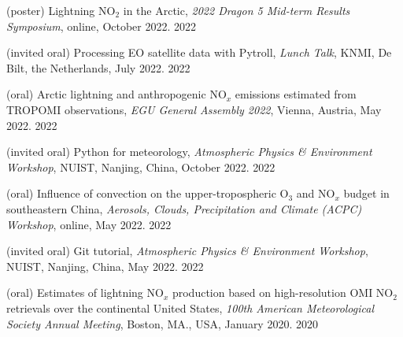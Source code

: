 \clearpage
{}


\begin{cvpublications}

\publication
{(poster) Lightning NO$_2$ in the Arctic,
\emph{2022 Dragon 5 Mid-term Results Symposium},
online, October 2022.} %
{2022} %

\publication
{(invited oral) Processing EO satellite data with Pytroll,
\emph{Lunch Talk},
KNMI, De Bilt, the Netherlands, July 2022.} %
{2022} %

\publication
{(oral) Arctic lightning and anthropogenic NO$_x$ emissions estimated from TROPOMI observations,
\emph{EGU General Assembly 2022},
Vienna, Austria, May 2022.} %
{2022} %

\publication
{(invited oral) Python for meteorology,
\emph{Atmospheric Physics \& Environment Workshop},
NUIST, Nanjing, China, October 2022.} %
{2022} %

\publication
{(oral) Influence of convection on the upper-tropospheric O$_3$ and NO$_x$ budget in southeastern China,
\emph{Aerosols, Clouds, Precipitation and Climate (ACPC) Workshop},
online, May 2022.} %
{2022} %

\publication
{(invited oral) Git tutorial,
\emph{Atmospheric Physics \& Environment Workshop},
NUIST, Nanjing, China, May 2022.} %
{2022} %

\publication
{(oral) Estimates of lightning NO$_x$ production based on high-resolution OMI NO$_2$ retrievals over the continental United States,
\emph{100th American Meteorological Society Annual Meeting},
Boston, MA., USA, January 2020.} %
{2020} %



\end{cvpublications}
